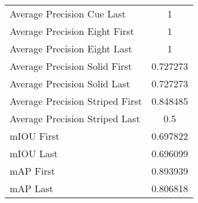 \begin{figure}
\begin{subfigure}[b]{0.49\textwidth}
\begin{tabular}{|l|c|}
        Average Precision Cue Last & 1 \\
        Average Precision Eight First & 1 \\
        Average Precision Eight Last & 1 \\
        Average Precision Solid First & 0.727273 \\
        Average Precision Solid Last & 0.727273 \\
        Average Precision Striped First & 0.848485 \\
        Average Precision Striped Last & 0.5 \\
        \hline
        mIOU First & 0.697822 \\
        mIOU Last & 0.696099 \\
        mAP First & 0.893939 \\
        mAP Last & 0.806818 \\
        \hline
    \end{tabular}    
\end{subfigure}
\end{figure}